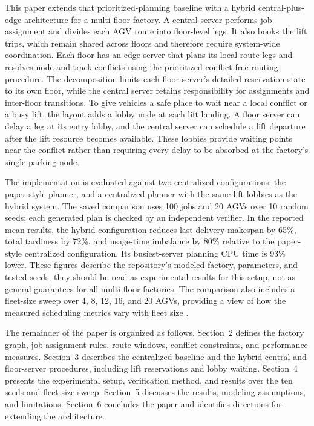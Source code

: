 \documentclass[11pt]{article}
\begin{document}
This paper extends that prioritized-planning baseline with a hybrid
central-plus-edge architecture for a multi-floor factory. A central server
performs job assignment and divides each AGV route into floor-level legs. It
also books the lift trips, which remain shared across floors and therefore
require system-wide coordination. Each floor has an edge server that plans
its local route legs and resolves node and track conflicts using the
prioritized conflict-free routing procedure. The decomposition limits each
floor server's detailed reservation state to its own floor, while the central
server retains responsibility for assignments and inter-floor transitions.
To give vehicles a safe place to wait near a local conflict or a busy lift,
the layout adds a lobby node at each lift landing. A floor server can delay a
leg at its entry lobby, and the central server can schedule a lift departure
after the lift resource becomes available. These lobbies provide waiting
points near the conflict rather than requiring every delay to be absorbed at
the factory's single parking node.

The implementation is evaluated against two centralized configurations: the
paper-style planner, and a centralized planner with the same lift lobbies as
the hybrid system. The saved comparison uses 100 jobs and 20 AGVs over 10
random seeds; each generated plan is checked by an independent verifier. In
the reported mean results, the hybrid configuration reduces last-delivery
makespan by 65\%, total tardiness by 72\%, and usage-time imbalance by 80\%
relative to the paper-style centralized configuration. Its busiest-server
planning CPU time is 93\% lower. These figures describe the repository's
modeled factory, parameters, and tested seeds; they should be read as
experimental results for this setup, not as general guarantees for all
multi-floor factories. The comparison also includes a fleet-size sweep over
4, 8, 12, 16, and 20 AGVs, providing a view of how the measured scheduling
metrics vary with fleet size \cite{results}.

The remainder of the paper is organized as follows. Section~2 defines the
factory graph, job-assignment rules, route windows, conflict constraints, and
performance measures. Section~3 describes the centralized baseline and the
hybrid central and floor-server procedures, including lift reservations and
lobby waiting. Section~4 presents the experimental setup, verification
method, and results over the ten seeds and fleet-size sweep. Section~5
discusses the results, modeling assumptions, and limitations. Section~6
concludes the paper and identifies directions for extending the architecture.
\end{document}
